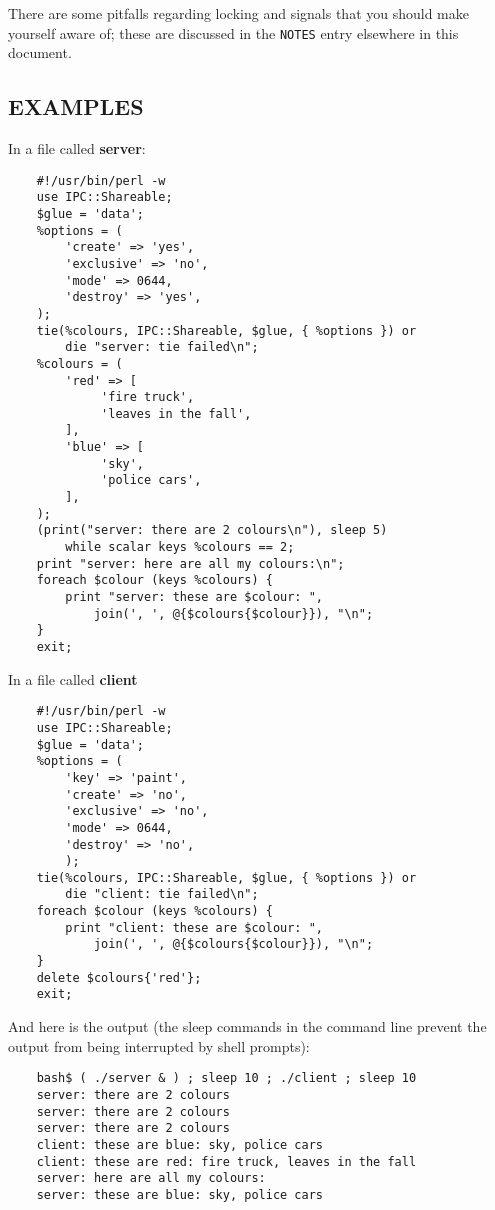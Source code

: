 There are some pitfalls regarding locking and signals that you should
make yourself aware of; these are discussed in the {\tt NOTES} entry elsewhere in this document.

\subsection*{EXAMPLES}
In a file called {\bf server}:
\begin{verbatim}
    #!/usr/bin/perl -w
    use IPC::Shareable;
    $glue = 'data';
    %options = (
        'create' => 'yes',
        'exclusive' => 'no',
        'mode' => 0644,
        'destroy' => 'yes',
    );
    tie(%colours, IPC::Shareable, $glue, { %options }) or
        die "server: tie failed\n";
    %colours = (
        'red' => [
             'fire truck',
             'leaves in the fall',
        ],
        'blue' => [
             'sky',
             'police cars',
        ],
    );
    (print("server: there are 2 colours\n"), sleep 5)
        while scalar keys %colours == 2;
    print "server: here are all my colours:\n";
    foreach $colour (keys %colours) {
        print "server: these are $colour: ",
            join(', ', @{$colours{$colour}}), "\n";
    }
    exit;
\end{verbatim}

In a file called {\bf client}
\begin{verbatim}
    #!/usr/bin/perl -w
    use IPC::Shareable;
    $glue = 'data';
    %options = (
        'key' => 'paint',
        'create' => 'no',
        'exclusive' => 'no',
        'mode' => 0644,
        'destroy' => 'no',
        );
    tie(%colours, IPC::Shareable, $glue, { %options }) or
        die "client: tie failed\n";
    foreach $colour (keys %colours) {
        print "client: these are $colour: ",
            join(', ', @{$colours{$colour}}), "\n";
    }
    delete $colours{'red'};
    exit;
\end{verbatim}

And here is the output (the sleep commands in the command line prevent
the output from being interrupted by shell prompts):
\begin{verbatim}
    bash$ ( ./server & ) ; sleep 10 ; ./client ; sleep 10
    server: there are 2 colours
    server: there are 2 colours
    server: there are 2 colours
    client: these are blue: sky, police cars
    client: these are red: fire truck, leaves in the fall
    server: here are all my colours:
    server: these are blue: sky, police cars
\end{verbatim}

